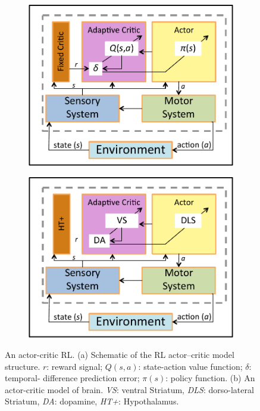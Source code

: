 \documentclass[preprint,12pt,authoryear]{elsarticle}
\begin{document}
\begin{figure}
\begin{subfigure}{.5\textwidth}
  \centering
  \includegraphics[width=.8\linewidth]{figures/TD-comp-model-schematic.pdf}
  \caption{}
  \label{fig-sub:actor-critic-schematic}
\end{subfigure}%
\begin{subfigure}{.5\textwidth}
  \centering
  \includegraphics[width=.8\linewidth]{figures/TD-brain-schematic.pdf}
  \caption{}
  \label{fig-sub:actor-critic-brain-schematic}
\end{subfigure}
\caption{An actor-critic RL. (a) Schematic of the RL actor–critic model structure. $r$: reward signal; $Q(s,a)$: state-action value function; $\delta$: temporal- difference prediction error; $\pi(s)$: policy function. (b) An actor-critic model of brain. \emph{VS}: ventral Striatum, \emph{DLS}: dorso-lateral Striatum, \emph{DA}: dopamine, \emph{HT+}: Hypothalamus.}
 \label{fig:TD-schematic}
\end{figure}
\end{document}
